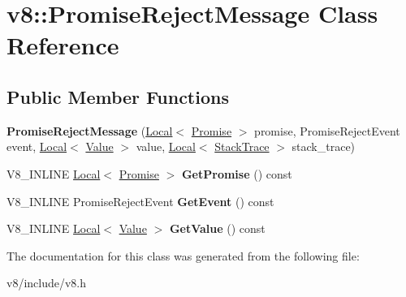 \hypertarget{classv8_1_1PromiseRejectMessage}{}\section{v8\+:\+:Promise\+Reject\+Message Class Reference}
\label{classv8_1_1PromiseRejectMessage}
\subsection*{Public Member Functions}
\begin{DoxyCompactItemize}
\item 
\mbox{\label{classv8_1_1PromiseRejectMessage_a052df173c75f1eb31b252714c88f3362}} 
{\bfseries Promise\+Reject\+Message} (\mbox{\hyperlink{classv8_1_1Local}{Local}}$<$ \mbox{\hyperlink{classv8_1_1Promise}{Promise}} $>$ promise, Promise\+Reject\+Event event, \mbox{\hyperlink{classv8_1_1Local}{Local}}$<$ \mbox{\hyperlink{classv8_1_1Value}{Value}} $>$ value, \mbox{\hyperlink{classv8_1_1Local}{Local}}$<$ \mbox{\hyperlink{classv8_1_1StackTrace}{Stack\+Trace}} $>$ stack\+\_\+trace)
\item 
\mbox{\label{classv8_1_1PromiseRejectMessage_a75f83c8b83d9b9dc78ec2703a378d4dd}} 
V8\+\_\+\+I\+N\+L\+I\+NE \mbox{\hyperlink{classv8_1_1Local}{Local}}$<$ \mbox{\hyperlink{classv8_1_1Promise}{Promise}} $>$ {\bfseries Get\+Promise} () const
\item 
\mbox{\label{classv8_1_1PromiseRejectMessage_aac1e21ad4c51e619103062b1eec2e046}} 
V8\+\_\+\+I\+N\+L\+I\+NE Promise\+Reject\+Event {\bfseries Get\+Event} () const
\item 
\mbox{\label{classv8_1_1PromiseRejectMessage_a146de470de1ac4294ea9ae54cc7e0894}} 
V8\+\_\+\+I\+N\+L\+I\+NE \mbox{\hyperlink{classv8_1_1Local}{Local}}$<$ \mbox{\hyperlink{classv8_1_1Value}{Value}} $>$ {\bfseries Get\+Value} () const
\end{DoxyCompactItemize}


The documentation for this class was generated from the following file\+:\begin{DoxyCompactItemize}
\item 
v8/include/v8.\+h\end{DoxyCompactItemize}
